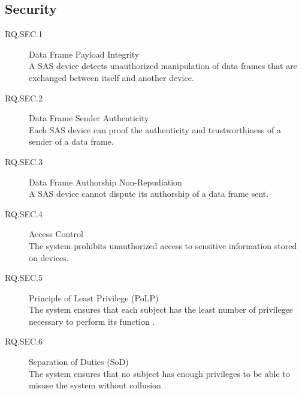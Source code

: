 \subsection{Security}
\begin{description}
    \item[RQ.SEC.1] Data Frame Payload Integrity\\
    A SAS device detects unauthorized manipulation of data frames that are exchanged between itself and another device.
    \item[RQ.SEC.2] Data Frame Sender Authenticity\\
    Each SAS device can proof the authenticity and trustworthiness of a sender of a data frame.
    \item[RQ.SEC.3] Data Frame Authorship Non-Repudiation\\
    A SAS device cannot dispute its authorship of a data frame sent.
    \item[RQ.SEC.4] Access Control\\
    The system prohibits unauthorized access to sensitive information stored on devices.
    \item[RQ.SEC.5] Principle of Least Privilege  (PoLP)\\
    The system ensures that each subject has the least number of privileges necessary to perform its function \cite{JTF2020}.
    \item[RQ.SEC.6] Separation of Duties (SoD)\\
    The system ensures that no subject has enough privileges to be able to misuse the system without collusion \cite{JTF2020}.
\end{description}

